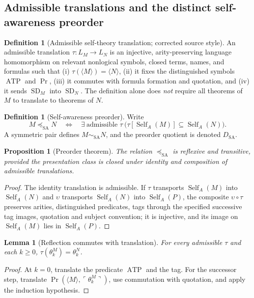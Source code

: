 \documentclass[11pt,letterpaper]{article}
\newtheorem{lemma}[theorem]{Lemma}
\newtheorem{proposition}[theorem]{Proposition}
\theoremstyle{definition}\newtheorem{definition}[theorem]{Definition}\newtheorem{example}[theorem]{Example}\newtheorem{protocol}[theorem]{Protocol}\newtheorem{question}[theorem]{Open Problem}
\theoremstyle{remark}\newtheorem{remark}[theorem]{Remark}
\newcommand{\Self}{\operatorname{Self}}
\newcommand{\SD}{\operatorname{SD}}
\newcommand{\Prov}{\operatorname{Pr}}
\newcommand{\sas}{\preceq_{\mathrm{SA}}}
\newcommand{\Mtag}{\langle M\rangle}
\newcommand{\qname}[1]{\ulcorner #1\urcorner}
\begin{document}
\subsection{Admissible translations and the distinct self-awareness preorder}
\begin{definition}[Admissible self-theory translation; corrected source style]\label{def:tau}
An admissible translation $\tau:L_M\to L_N$ is an injective, arity-preserving language homomorphism on relevant nonlogical symbols, closed terms, names, and formulas such that (i) $\tau(\Mtag)=\langle N\rangle$, (ii) it fixes the distinguished symbols $\operatorname{ATP}$ and $\Prov$, (iii) it commutes with formula formation and quotation, and (iv) it sends $\SD_M$ into $\SD_N$. The definition alone does \emph{not} require all theorems of $M$ to translate to theorems of $N$.
\end{definition}
\begin{definition}[Self-awareness preorder]
Write
\[
M\sas N\quad\Longleftrightarrow\quad \exists\ \text{admissible }\tau\ \bigl(\tau[\Self_A(M)]\subseteq\Self_A(N)\bigr).
\]
A symmetric pair defines $M\sim_{\mathrm{SA}}N$, and the preorder quotient is denoted $D_{\mathrm{SA}}$.
\end{definition}
\begin{proposition}[Preorder theorem]
The relation $\sas$ is reflexive and transitive, provided the presentation class is closed under identity and composition of admissible translations.
\end{proposition}
\begin{proof}
The identity translation is admissible. If $\tau$ transports $\Self_A(M)$ into $\Self_A(N)$ and $\upsilon$ transports $\Self_A(N)$ into $\Self_A(P)$, the composite $\upsilon\circ\tau$ preserves arities, distinguished predicates, tags through the specified successive tag images, quotation and subject convention; it is injective, and its image on $\Self_A(M)$ lies in $\Self_A(P)$.
\end{proof}
\begin{lemma}[Reflection commutes with translation]\label{lem:theta}
For every admissible $\tau$ and each $k\ge0$, $\tau(\theta_k^M)=\theta_k^N$.
\end{lemma}
\begin{proof}
At $k=0$, translate the predicate $\operatorname{ATP}$ and the tag. For the successor step, translate $\Prov(\Mtag,\qname{\theta_k^M})$, use commutation with quotation, and apply the induction hypothesis.
\end{proof}
\end{document}
